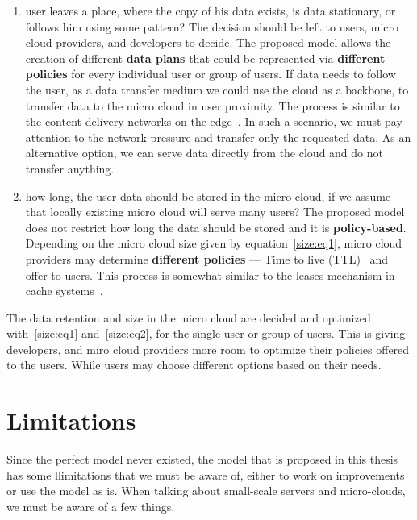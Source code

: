 \begin{enumerate}
	\item user leaves a place, where the copy of his data exists, is data stationary, or follows him using some pattern? The decision should be left to users, micro cloud providers, and developers to decide. The proposed model allows the creation of different \textbf{data plans} that could be represented via \textbf{different policies} for every individual user or group of users. If data needs to follow the user, as a data transfer medium we could use the cloud as a backbone, to transfer data to the micro cloud in user proximity. The process is similar to the content delivery networks on the edge~\cite{inbookKurniawan}. In such a scenario, we must pay attention to the network pressure and transfer only the requested data. As an alternative option, we can serve data directly from the cloud and do not transfer anything.
	\item how long, the user data should be stored in the micro cloud, if we assume that locally existing micro cloud will serve many users? The proposed model does not restrict how long the data should be stored and it is \textbf{policy-based}. Depending on the micro cloud size given by equation~\ref{size:eq1}, micro cloud providers may determine \textbf{different policies} --- Time to live (TTL)~\cite{CohenHK05} and offer to users. This process is somewhat similar to the leases mechanism in cache systems~\cite{GrayC89}. 
\end{enumerate}

The data retention and size in the micro cloud are decided and optimized with~\ref{size:eq1} and~\ref{size:eq2}, for the single user or group of users. This is giving developers, and miro cloud providers more room to optimize their policies offered to the users. While users may choose different options based on their needs.
%
%
\section{Limitations}\label{sec:limitations}
%
Since the perfect model never existed, the model that is proposed in this thesis has some llimitations that we must be aware of, either to work on improvements or use the model as is. When talking about small-scale servers and micro-clouds, we must be aware of a few things.

